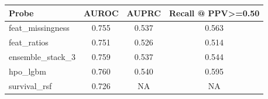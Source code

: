 \begin{tabular}{@{}lccc@{}}
\toprule
Probe & AUROC & AUPRC & Recall @ PPV>=0.50\\
\midrule
feat\_missingness & 0.755 & 0.537 & 0.563\\
feat\_ratios & 0.751 & 0.526 & 0.514\\
ensemble\_stack\_3 & 0.759 & 0.537 & 0.544\\
hpo\_lgbm & 0.760 & 0.540 & 0.595\\
survival\_rsf & 0.726 & NA & NA\\
\bottomrule
\end{tabular}
